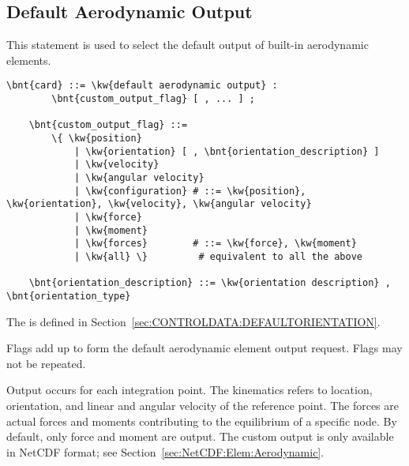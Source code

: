 \subsection{Default Aerodynamic Output}\label{sec:CONTROLDATA:DEFAULTAERODYNAMICOUTPUT}
This statement is used to select the default output of built-in aerodynamic elements.
\begin{Verbatim}[commandchars=\\\{\}]
    \bnt{card} ::= \kw{default aerodynamic output} :
        \bnt{custom_output_flag} [ , ... ] ;

    \bnt{custom_output_flag} ::=
        \{ \kw{position}
            | \kw{orientation} [ , \bnt{orientation_description} ]
            | \kw{velocity}
            | \kw{angular velocity}
            | \kw{configuration} # ::= \kw{position}, \kw{orientation}, \kw{velocity}, \kw{angular velocity}
            | \kw{force}
            | \kw{moment}
            | \kw{forces}        # ::= \kw{force}, \kw{moment}
            | \kw{all} \}         # equivalent to all the above

    \bnt{orientation_description} ::= \kw{orientation description} , \bnt{orientation_type}
\end{Verbatim}
The  is defined
in Section~\ref{sec:CONTROLDATA:DEFAULTORIENTATION}.

Flags add up to form the default aerodynamic element output request.
Flags may not be repeated.

Output occurs for each integration point.
The kinematics refers to location, orientation,
and linear and angular velocity of the reference point.
The forces are actual forces and moments contributing
to the equilibrium of a specific node.
By default, only force and moment are output.
The custom output is only available in NetCDF format;
see Section~\ref{sec:NetCDF:Elem:Aerodynamic}.


